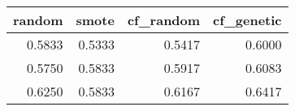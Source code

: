\begin{tabular}{rrrr}
\toprule
 random &  smote &  cf\_random &  cf\_genetic \\
\midrule
 0.5833 & 0.5333 &     0.5417 &      0.6000 \\
 0.5750 & 0.5833 &     0.5917 &      0.6083 \\
 0.6250 & 0.5833 &     0.6167 &      0.6417 \\
\bottomrule
\end{tabular}
